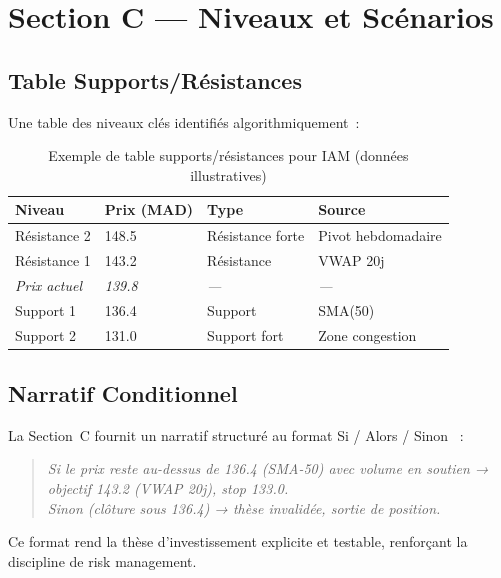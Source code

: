 \section{Section C --- Niveaux et Scénarios}
\label{sec:niveaux_scenarios}

\subsection{Table Supports/Résistances}

Une table des niveaux clés identifiés algorithmiquement~:

\begin{table}[H]
\centering
\caption{Exemple de table supports/résistances pour IAM (données illustratives)}
\label{tab:sr_levels}
\begin{tabularx}{\linewidth}{@{}lYYY@{}}
\toprule
\textbf{Niveau} & \textbf{Prix (MAD)} & \textbf{Type}    & \textbf{Source} \\
\midrule
Résistance 2    & 148.5               & Résistance forte & Pivot hebdomadaire \\
Résistance 1    & 143.2               & Résistance       & VWAP 20j \\
\textit{Prix actuel} & \textit{139.8} & \textit{—}       & \textit{—} \\
Support 1       & 136.4               & Support          & SMA(50) \\
Support 2       & 131.0               & Support fort     & Zone congestion \\
\bottomrule
\end{tabularx}
\end{table}

\subsection{Narratif Conditionnel}

La Section~C fournit un narratif structuré au format \og Si / Alors / Sinon \fg{}~:

\begin{quote}
\textit{Si le prix reste au-dessus de 136.4 (SMA-50) avec volume en soutien →
objectif 143.2 (VWAP 20j), stop 133.0. \\
Sinon (clôture sous 136.4) → thèse invalidée, sortie de position.}
\end{quote}

Ce format rend la thèse d'investissement explicite et testable, renforçant la
discipline de risk management.

